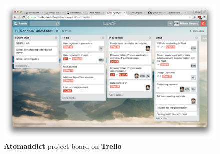 \documentclass[12pt]{article}
\begin{document}
\begin{figure}[H]
    \centering
    \includegraphics[width=\textwidth]{images/trello.png}
    \caption{\textbf{Atomaddict} project board on \textbf{Trello}}
    \label{fig:trello}
\end{figure}


\end{document}
